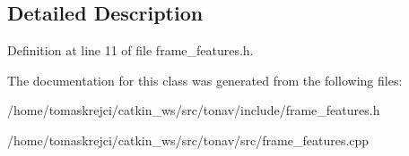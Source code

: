 \subsection{Detailed Description}


Definition at line 11 of file frame\-\_\-features.\-h.



The documentation for this class was generated from the following files\-:\begin{DoxyCompactItemize}
\item 
/home/tomaskrejci/catkin\-\_\-ws/src/tonav/include/frame\-\_\-features.\-h\item 
/home/tomaskrejci/catkin\-\_\-ws/src/tonav/src/frame\-\_\-features.\-cpp\end{DoxyCompactItemize}
